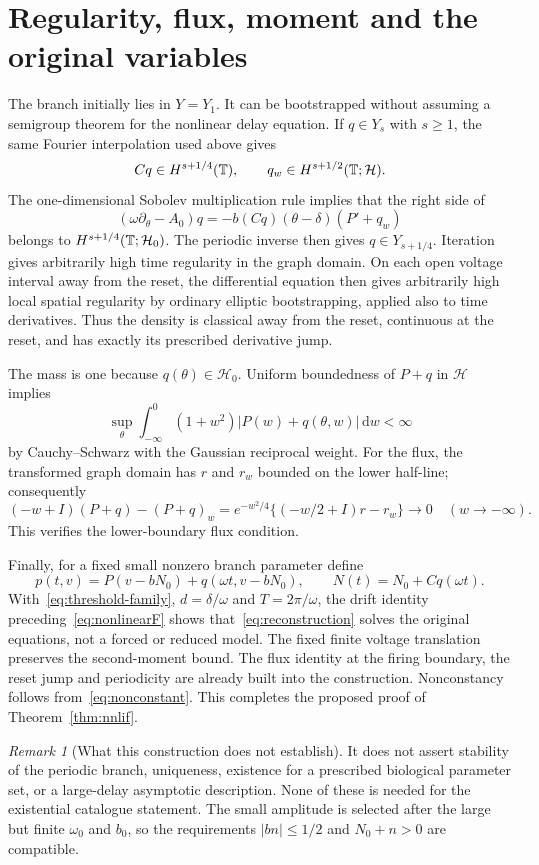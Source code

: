 \documentclass[11pt,a4paper]{article}
\numberwithin{equation}{section}
\theoremstyle{remark}\newtheorem{remark}[theorem]{Remark}
\newcommand{\HH}{\mathcal H}\newcommand{\DD}{\mathcal D}
\newcommand{\dd}{\,\mathrm d}
\begin{document}
\section{Regularity, flux, moment and the original variables}
The branch initially lies in $Y=Y_1$. It can be bootstrapped without assuming a semigroup theorem for the nonlinear delay equation. If $q\in Y_s$ with $s\geq1$, the same Fourier interpolation used above gives
\[
 Cq\in H^{s+1/4}(\T),\qquad
 q_w\in H^{s+1/2}(\T;\HH).
\]
The one-dimensional Sobolev multiplication rule implies that the right side of
\[
 (\omega\partial_\theta-A_0)q
 =-b(Cq)(\theta-\delta)(P'+q_w)
\]
belongs to $H^{s+1/4}(\T;\HH_0)$. The periodic inverse then gives $q\in Y_{s+1/4}$. Iteration gives arbitrarily high time regularity in the graph domain. On each open voltage interval away from the reset, the differential equation then gives arbitrarily high local spatial regularity by ordinary elliptic bootstrapping, applied also to time derivatives. Thus the density is classical away from the reset, continuous at the reset, and has exactly its prescribed derivative jump.

The mass is one because $q(\theta)\in\HH_0$. Uniform boundedness of $P+q$ in $\HH$ implies
\[
 \sup_\theta\int_{-\infty}^0(1+w^2)|P(w)+q(\theta,w)|\dd w<\infty
\]
by Cauchy--Schwarz with the Gaussian reciprocal weight. For the flux, the transformed graph domain has $r$ and $r_w$ bounded on the lower half-line; consequently
\[
 (-w+I)(P+q)-(P+q)_w
 =e^{-w^2/4}\{(-w/2+I)r-r_w\}\longrightarrow0
 \quad(w\to-\infty).
\]
This verifies the lower-boundary flux condition.

Finally, for a fixed small nonzero branch parameter define
\begin{equation}\label{eq:reconstruction}
 p(t,v)=P(v-bN_0)+q(\omega t,v-bN_0),
 \qquad N(t)=N_0+Cq(\omega t).
\end{equation}
With~\eqref{eq:threshold-family}, $d=\delta/\omega$ and $T=2\pi/\omega$, the drift identity preceding~\eqref{eq:nonlinearF} shows that~\eqref{eq:reconstruction} solves the original equations, not a forced or reduced model. The fixed finite voltage translation preserves the second-moment bound. The flux identity at the firing boundary, the reset jump and periodicity are already built into the construction. Nonconstancy follows from~\eqref{eq:nonconstant}. This completes the proposed proof of Theorem~\ref{thm:nnlif}.

\begin{remark}[What this construction does not establish]
It does not assert stability of the periodic branch, uniqueness, existence for a prescribed biological parameter set, or a large-delay asymptotic description. None of these is needed for the existential catalogue statement. The small amplitude is selected after the large but finite $\omega_0$ and $b_0$, so the requirements $|b n|\leq1/2$ and $N_0+n>0$ are compatible.
\end{remark}
\end{document}

